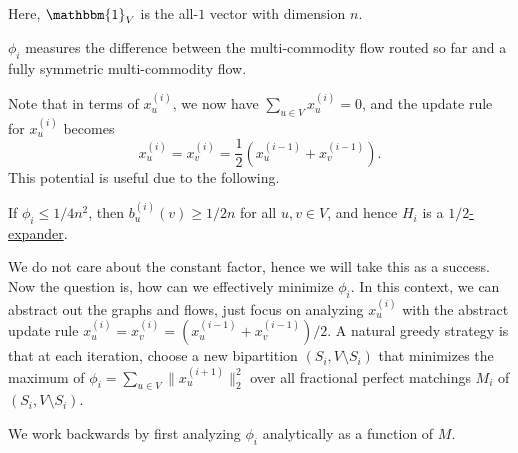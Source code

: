\begin{notation}
	Here, \(\mathbbm{1}_{V} \) is the all-\(1\) vector with dimension \(n\).
\end{notation}

\begin{intuition}
	\(\phi _i\) measures the difference between the multi-commodity flow routed so far and a fully symmetric multi-commodity flow.
\end{intuition}

Note that in terms of \(x_u^{(i)}\), we now have \(\sum_{u \in V} x_u^{(i)} = 0\), and the update rule for \(x_u^{(i)}\) becomes
\[
	x_u^{(i)}
	= x_v^{(i)}
	= \frac{1}{2} (x_u^{(i-1)} + x_v^{(i-1)}).
\]
This potential is useful due to the following.

\begin{claim}
	If \(\phi _i \leq 1 / 4n^2\), then \(b_u^{(i)}(v) \geq 1 / 2n\) for all \(u, v \in V\), and hence \(H_i\) is a \hyperref[def:expander]{\(1 / 2\)-expander}.
\end{claim}

We do not care about the constant factor, hence we will take this as a success. Now the question is, how can we effectively minimize \(\phi _i\). In this context, we can abstract out the graphs and flows, just focus on analyzing \(x_u^{(i)}\) with the abstract update rule \(x_u^{(i)} = x_v^{(i)} = (x_u^{(i-1)} + x_v^{(i-1)}) / 2\). A natural greedy strategy is that at each iteration, choose a new bipartition \((S_i , V\setminus S_i )\) that minimizes the maximum of \(\phi _i = \sum_{u \in V} \lVert x_u^{(i+1)} \rVert _2^2\) over all fractional perfect matchings \(M_i \) of \((S_i , V\setminus S_i )\).

We work backwards by first analyzing \(\phi _i\) analytically as a function of \(M\).

